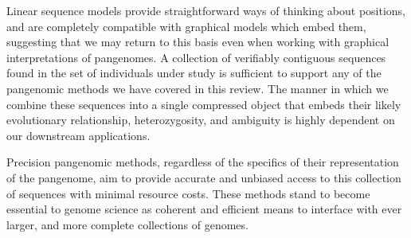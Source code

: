 Linear sequence models provide straightforward ways of thinking about positions, and are completely compatible with graphical models which embed them, suggesting that we may return to this basis even when working with graphical interpretations of pangenomes.
A collection of verifiably contiguous sequences found in the set of individuals under study is sufficient to support any of the pangenomic methods we have covered in this review.
The manner in which we combine these sequences into a single compressed object that embeds their likely evolutionary relationship, heterozygosity, and ambiguity is highly dependent on our downstream applications.

Precision pangenomic methods, regardless of the specifics of their representation of the pangenome, aim to provide accurate and unbiased access to this collection of sequences with minimal resource costs.
These methods stand to become essential to genome science as coherent and efficient means to interface with ever larger, and more complete collections of genomes.







